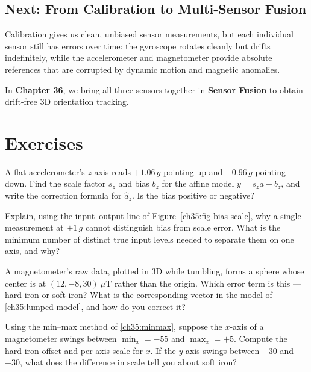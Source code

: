 \subsection{Next: From Calibration to Multi-Sensor Fusion}
Calibration gives us clean, unbiased sensor measurements, but each individual sensor still has errors over time: the gyroscope rotates cleanly but drifts indefinitely, while the accelerometer and magnetometer provide absolute references that are corrupted by dynamic motion and magnetic anomalies. 

In \textbf{Chapter 36}, we bring all three sensors together in \textbf{Sensor Fusion} to obtain drift-free 3D orientation tracking.

\section{Exercises}
\label{ch35:exercises}

\begin{exercise}
A flat accelerometer's $z$-axis reads $+1.06\,g$ pointing up and $-0.96\,g$
pointing down. Find the scale factor $s_z$ and bias $b_z$ for the affine model
$y=s_z a + b_z$, and write the correction formula for $\hat a_z$. Is the bias
positive or negative?
\end{exercise}

\begin{exercise}
Explain, using the input--output line of Figure~\ref{ch35:fig-bias-scale}, why a
single measurement at $+1\,g$ cannot distinguish bias from scale error. What is
the minimum number of distinct true input levels needed to separate them on one
axis, and why?
\end{exercise}

\begin{exercise}
A magnetometer's raw data, plotted in 3D while tumbling, forms a sphere whose
center is at $(12, -8, 30)\ \mu\mathrm{T}$ rather than the origin. Which error
term is this --- hard iron or soft iron? What is the corresponding vector in the
model of \eqref{ch35:lumped-model}, and how do you correct it?
\end{exercise}

\begin{exercise}
Using the min--max method of \eqref{ch35:minmax}, suppose the $x$-axis of a
magnetometer swings between $\min_x = -55$ and $\max_x = +5$. Compute the
hard-iron offset and per-axis scale for $x$. If the $y$-axis swings between
$-30$ and $+30$, what does the difference in scale tell you about soft iron?
\end{exercise}

